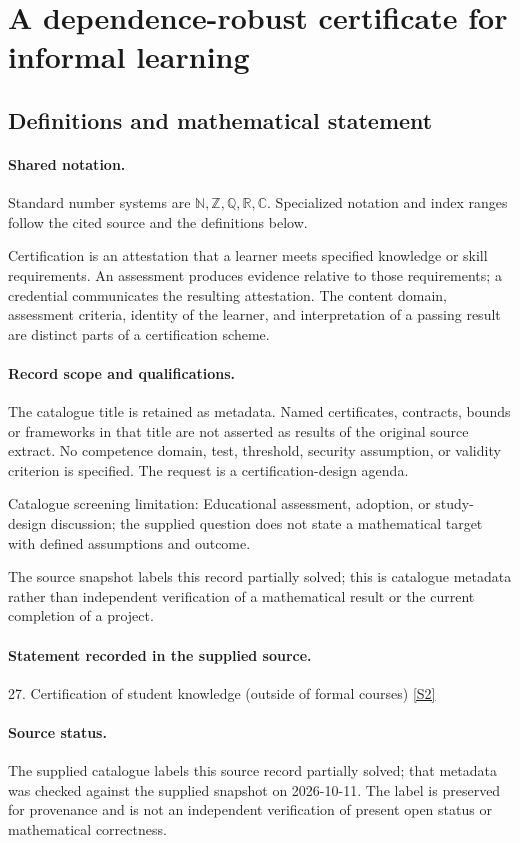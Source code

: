 \documentclass[11pt]{article}
\newcommand{\sref}[2]{\hyperlink{source:#1:#2}{[S#2]}}
\begin{document}
\section{A dependence-robust certificate for informal learning}\label{statement}

\subsection{Definitions and mathematical statement}

\paragraph{Shared notation.}Standard number systems are $\mathbb N,\mathbb Z,\mathbb Q,\mathbb R,\mathbb C$. Specialized notation and index ranges follow the cited source and the definitions below.


Certification is an attestation that a learner meets specified knowledge or skill requirements. An assessment produces evidence relative to those requirements; a credential communicates the resulting attestation. The content domain, assessment criteria, identity of the learner, and interpretation of a passing result are distinct parts of a certification scheme.
\paragraph{Record scope and qualifications.}
The catalogue title is retained as metadata. Named certificates, contracts, bounds or frameworks in that title are not asserted as results of the original source extract.
No competence domain, test, threshold, security assumption, or validity criterion is specified. The request is a certification-design agenda.

Catalogue screening limitation: Educational assessment, adoption, or study-design discussion; the supplied question does not state a mathematical target with defined assumptions and outcome.

The source snapshot labels this record partially solved; this is catalogue metadata rather than independent verification of a mathematical result or the current completion of a project.
\paragraph{Statement recorded in the supplied source.}
27. Certification of student knowledge (outside of formal courses) \sref{statement}{2}
\paragraph{Source status.}
The supplied catalogue labels this source record partially solved; that metadata was checked against the supplied snapshot on 2026-10-11. The label is preserved for provenance and is not an independent verification of present open status or mathematical correctness.
\end{document}

